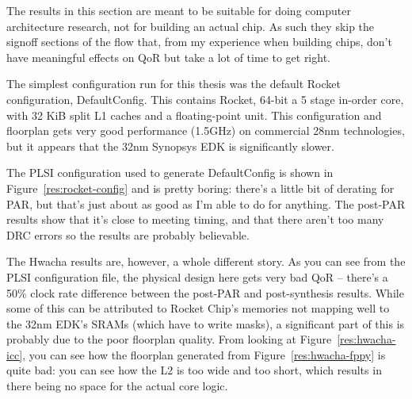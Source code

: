 \documentclass{article}
\begin{document}
The results in this section are meant to be suitable for doing computer
architecture research, not for building an actual chip.  As such they skip the
signoff sections of the flow that, from my experience when building chips,
don't have meaningful effects on QoR but take a lot of time to get right.

The simplest configuration run for this thesis was the default Rocket
configuration, DefaultConfig.  This contains Rocket, 64-bit a 5 stage in-order
core, with 32 KiB split L1 caches and a floating-point unit.  This
configuration and floorplan gets very good performance (1.5GHz) on commercial
28nm technologies, but it appears that the 32nm Synopsys EDK is significantly
slower.

The PLSI configuration used to generate DefaultConfig is shown in
Figure~\ref{res:rocket-config} and is pretty boring: there's a little bit of
derating for PAR, but that's just about as good as I'm able to do for anything.
The post-PAR results show that it's close to meeting timing, and that there
aren't too many DRC errors so the results are probably believable.

The Hwacha results are, however, a whole different story.  As you can see from
the PLSI configuration file, the physical design here gets very bad QoR --
there's a 50\% clock rate difference between the post-PAR and post-synthesis
results.  While some of this can be attributed to Rocket Chip's memories not
mapping well to the 32nm EDK's SRAMs (which have to write masks), a significant
part of this is probably due to the poor floorplan quality.  From looking at
Figure~\ref{res:hwacha-icc}, you can see how the floorplan generated from
Figure~\ref{res:hwacha-fppy} is quite bad: you can see how the L2 is too wide
and too short, which results in there being no space for the actual core logic.
\end{document}
